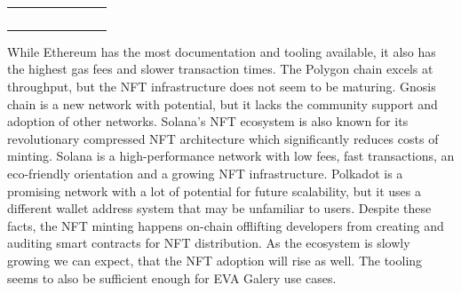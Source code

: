 \begin{table}[htb!]
\begin{tabular}{|l|l|l|l|l|l|l|l|}
$$    \end{tabular}
    \label{tab:networks}
    \end{table}


While Ethereum has the most documentation and tooling available, it also has the highest gas fees and slower transaction times. The Polygon chain excels at throughput, but the NFT infrastructure does not seem to be maturing. Gnosis chain is a new network with potential, but it lacks the community support and adoption of other networks. Solana's NFT ecosystem is also known for its revolutionary compressed NFT architecture which significantly reduces costs of minting.  Solana is a high-performance network with low fees, fast transactions, an eco-friendly orientation and a growing NFT infrastructure. Polkadot is a promising network with a lot of potential for future scalability, but it uses a different wallet address system that may be unfamiliar to users. Despite these facts, the NFT minting happens on-chain offlifting developers from creating and auditing smart contracts for NFT distribution. As the ecosystem is slowly growing we can expect, that the NFT adoption will rise as well. The tooling seems to also be sufficient enough for EVA Galery use cases. 